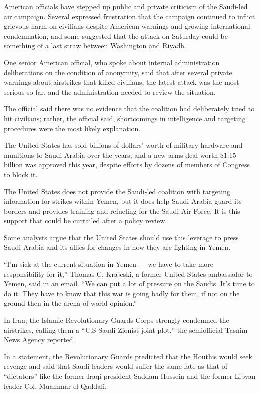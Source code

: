 American officials have stepped up public and private criticism of the
Saudi-led air campaign. Several expressed frustration that the campaign
continued to inflict grievous harm on civilians despite American
warnings and growing international condemnation, and some suggested that
the attack on Saturday could be something of a last straw between
Washington and Riyadh.

One senior American official, who spoke about internal administration
deliberations on the condition of anonymity, said that after several
private warnings about airstrikes that killed civilians, the latest
attack was the most serious so far, and the administration needed to
review the situation.

The official said there was no evidence that the coalition had
deliberately tried to hit civilians; rather, the official said,
shortcomings in intelligence and targeting procedures were the most
likely explanation.

The United States has sold billions of dollars' worth of military
hardware and munitions to Saudi Arabia over the years, and a new arms
deal worth \$1.15 billion was approved this year, despite efforts by
dozens of members of Congress to block it.

The United States does not provide the Saudi-led coalition with
targeting information for strikes within Yemen, but it does help Saudi
Arabia guard its borders and provides training and refueling for the
Saudi Air Force. It is this support that could be curtailed after a
policy review.

Some analysts argue that the United States should use this leverage to
press Saudi Arabia and its allies for changes in how they are fighting
in Yemen.

``I'm sick at the current situation in Yemen --- we have to take more
responsibility for it,'' Thomas C. Krajeski, a former United States
ambassador to Yemen, said in an email. ``We can put a lot of pressure on
the Saudis. It's time to do it. They have to know that this war is going
badly for them, if not on the ground then in the arena of world
opinion.''

In Iran, the Islamic Revolutionary Guards Corps strongly condemned the
airstrikes, calling them a ``U.S-Saudi-Zionist joint plot,'' the
semiofficial Tasnim News Agency reported.

In a statement, the Revolutionary Guards predicted that the Houthis
would seek revenge and said that Saudi leaders would suffer the same
fate as that of ``dictators'' like the former Iraqi president Saddam
Hussein and the former Libyan leader Col. Muammar el-Qaddafi.

